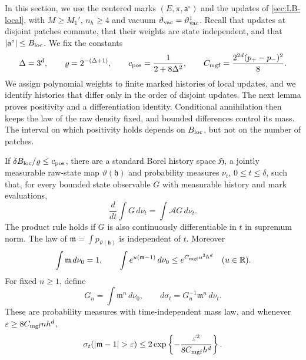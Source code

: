 In this section, we use the centered marks $(E,\pi,\mathsf a^\circ)$
and the updates of \cref{sec:LB-local}, with $M\ge M_1'$, $n_h\ge4$ and
vacuum \(\vartheta_{\rm vac}=\vartheta^1_{\rm vac}\). Recall that updates
at disjoint patches commute, that their weights are state independent,
and that $|\mathsf a^\circ|\le B_{\rm loc}$. We fix the constants
\begin{equation}\label{eq:LB-prior-constants}
 \Delta=3^d,\qquad \varrho=2^{-(\Delta+1)},\qquad
 c_{\rm pos}=\frac1{2+8\Delta^2},\qquad
 C_{\rm mgf}=\frac{2^{2d}(p_+-p_-)^2}{8}.
\end{equation}
We assign polynomial weights to finite marked histories of local
updates, and we identify histories that differ only in the order of
disjoint updates. The next lemma proves positivity and a differentiation
identity. Conditional annihilation then keeps the law of the raw density
fixed, and bounded differences control its mass. The interval on which
positivity holds depends on $B_{\rm loc}$, but not on the number of
patches.

\begin{lemma}\label{lem:positive-realization}
If $\delta B_{\rm loc}/\varrho\le c_{\rm pos}$, there are a standard
Borel history space $\mathfrak H$, a jointly measurable raw-state map
$\vartheta(\mathfrak h)$ and probability measures $\nu_t$,
$0\le t\le\delta$, such that, for every bounded state observable $G$
with measurable history and mark evaluations,
\begin{equation}\label{eq:LB-weak-transport}
 \frac d{dt}\int G\,d\nu_t=\int\mathcal AG\,d\nu_t.
\end{equation}
The product rule holds if $G$ is also continuously differentiable in
$t$ in supremum norm. The law of
$\mathfrak m=\int p_{\vartheta(\mathfrak h)}$ is independent of $t$.
Moreover
\begin{equation}\label{eq:LB-mass-mgf}
 \int\mathfrak m\,d\nu_0=1,\qquad
 \int e^{u(\mathfrak m-1)}\,d\nu_0
 \le e^{C_{\rm mgf}u^2h^d}\quad(u\in\mathbb R).
\end{equation}
For fixed $n\ge1$, define
\begin{equation}\label{eq:LB-tilted-prior}
 G_n=\int\mathfrak m^n\,d\nu_0,\qquad
 d\sigma_t=G_n^{-1}\mathfrak m^n\,d\nu_t.
\end{equation}
These are probability measures with time-independent mass law, and
whenever $\varepsilon\ge8C_{\rm mgf}nh^d$,
\begin{equation}\label{eq:LB-mass-tail}
 \sigma_t(|\mathfrak m-1|>\varepsilon)
 \le2\exp\left\{-\frac{\varepsilon^2}
                         {8C_{\rm mgf}h^d}\right\}.
\end{equation}
\end{lemma}

